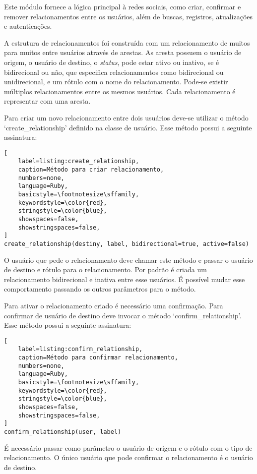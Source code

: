 Este módulo fornece a lógica principal à redes sociais, como criar, confirmar e remover relacionamentos entre os usuários, além de buscas, registros, atualizações e autenticações.

A estrutura de relacionamentos foi construída com um relacionamento de muitos para muitos entre usuários através de arestas. As aresta possuem o usuário de origem, o usuário de destino, o \textit{status}, pode estar ativo ou inativo, se é bidirecional ou não, que  especifica relacionamentos como bidirecional ou unidirecional, e um rótulo com o nome do relacionamento. Pode-se existir múltiplos relacionamentos entre os mesmos usuários. Cada relacionamento é representar com uma aresta.

Para criar um novo relacionamento entre dois usuários deve-se utilizar o método `create\_relationship' definido na classe de usuário. Esse método possui a seguinte assinatura:

\begin{lstlisting}[
    label=listing:create_relationship,
    caption=Método para criar relacionamento,
    numbers=none,
    language=Ruby,
    basicstyle=\footnotesize\sffamily,
    keywordstyle=\color{red},
    stringstyle=\color{blue},
    showspaces=false,
    showstringspaces=false,
]
create_relationship(destiny, label, bidirectional=true, active=false)
\end{lstlisting}

O usuário que pede o relacionamento deve chamar este método e passar o usuário de destino e rótulo para o relacionamento. Por padrão é criada um relacionamento bidirecional e inativa entre esse usuários. É possível mudar esse comportamento passando os outros parâmetros para o método.

Para ativar o relacionamento criado é necessário uma confirmação. Para confirmar de usuário de destino deve invocar o método `confirm\_relationship'. Esse método possui a seguinte assinatura:

\begin{lstlisting}[
    label=listing:confirm_relationship,
    caption=Método para confirmar relacionamento,
    numbers=none,
    language=Ruby,
    basicstyle=\footnotesize\sffamily,
    keywordstyle=\color{red},
    stringstyle=\color{blue},
    showspaces=false,
    showstringspaces=false,
]
confirm_relationship(user, label)
\end{lstlisting}

É necessário passar como parâmetro o usuário de origem e o rótulo com o tipo de relacionamento. O único usuário que pode confirmar o relacionamento é o usuário de destino.

